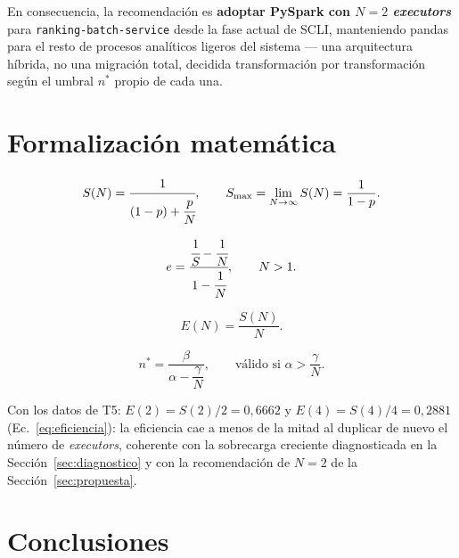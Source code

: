 \documentclass[10pt,conference]{IEEEtran}
\begin{document}
En consecuencia, la recomendación es \textbf{adoptar PySpark con $N=2$ \textit{executors}} para \texttt{ranking-batch-service} desde la fase actual de SCLI, manteniendo pandas para el resto de procesos analíticos ligeros del sistema --- una arquitectura híbrida, no una migración total, decidida transformación por transformación según el umbral $n^{*}$ propio de cada una.

\section{Formalización matemática}
\label{sec:formal}

\begin{equation}
S(N) = \cfrac{1}{(1-p) + \cfrac{p}{N}}, \qquad S_{\max} = \lim_{N\to\infty} S(N) = \frac{1}{1-p}.
\label{eq:amdahl}
\end{equation}

\begin{equation}
e = \cfrac{\cfrac{1}{S} - \cfrac{1}{N}}{1 - \cfrac{1}{N}}, \qquad N>1.
\label{eq:karpflatt}
\end{equation}

\begin{equation}
E(N) = \frac{S(N)}{N}.
\label{eq:eficiencia}
\end{equation}

\begin{equation}
n^{*} = \frac{\beta}{\alpha - \dfrac{\gamma}{N}}, \qquad \text{válido si } \alpha > \frac{\gamma}{N}.
\label{eq:umbral}
\end{equation}

Con los datos de T5: $E(2)=S(2)/2=0{,}6662$ y $E(4)=S(4)/4=0{,}2881$ (Ec.~\eqref{eq:eficiencia}): la eficiencia cae a menos de la mitad al duplicar de nuevo el número de \textit{executors}, coherente con la sobrecarga creciente diagnosticada en la Sección~\ref{sec:diagnostico} y con la recomendación de $N=2$ de la Sección~\ref{sec:propuesta}.

\section{Conclusiones}
\label{sec:conclusiones}
\end{document}
